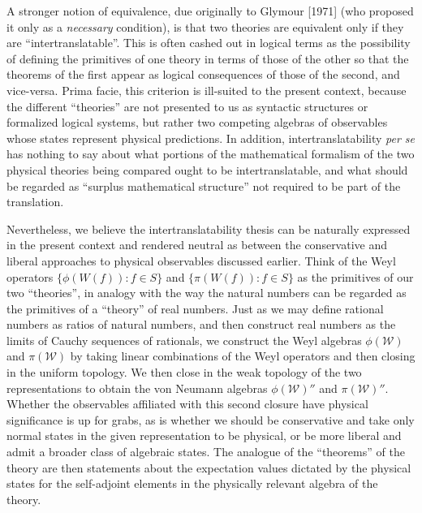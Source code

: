 \documentclass[12pt]{article}
\theoremstyle{remark}
\theoremstyle{definition}
\newcommand{\alg}[1]{\mathcal{#1}}
\begin{document}
A stronger notion of equivalence, due originally to Glymour [1971]
(who proposed it only as a \emph{necessary} condition), is that two
theories are equivalent only if they are ``intertranslatable''.  This
is often cashed out in logical terms as the possibility of defining
the primitives of one theory in terms of those of the other so that
the theorems of the first appear as logical consequences of those of
the second, and vice-versa.  Prima facie, this criterion is ill-suited
to the present context, because the different ``theories'' are not
presented to us as syntactic structures or formalized logical systems,
but rather two competing algebras of observables whose states
represent physical predictions.  In addition, intertranslatability
\emph{per se} has nothing to say about what portions of the
mathematical formalism of the two physical theories being compared
ought to be intertranslatable, and what should be regarded as
``surplus mathematical structure'' not required to be part of the
translation.

Nevertheless, we believe the intertranslatability thesis can be
naturally expressed in the present context and rendered neutral as
between the conservative and liberal approaches to physical
observables discussed earlier.  Think of the Weyl operators
$\{\phi(W(f)):f\in S\}$ and $\{\pi(W(f)):f\in S\}$ as the primitives
of our two ``theories'', in analogy with the way the natural numbers
can be regarded as the primitives of a ``theory'' of real numbers.
Just as we may define rational numbers as ratios of natural numbers,
and then construct real numbers as the limits of Cauchy sequences of
rationals, we construct the Weyl algebras $\phi(\alg{W})$ and
$\pi(\alg{W})$ by taking linear combinations of the Weyl operators and
then closing in the uniform topology.  We then close in the weak
topology of the two representations to obtain the von Neumann algebras
$\phi(\alg{W})''$ and $\pi(\alg{W})''$.  Whether the observables
affiliated with this second closure have physical significance is up
for grabs, as is whether we should be conservative and take only
normal states in the given representation to be physical, or be more
liberal and admit a broader class of algebraic states.  The analogue
of the ``theorems'' of the theory are then statements about the
expectation values dictated by the physical states for the
self-adjoint elements in the physically relevant algebra of the
theory.
\end{document}
